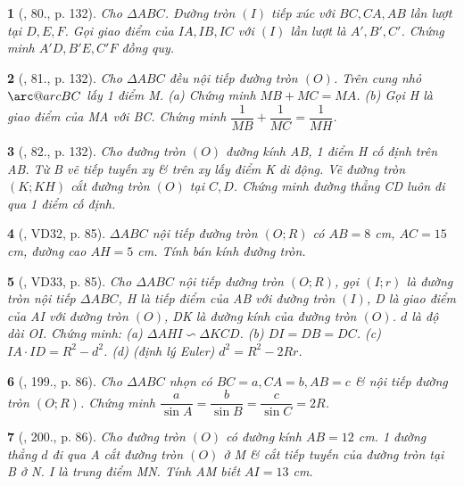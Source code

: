 \documentclass{article}
\makeatletter
\newcommand{\arc@char}{{\usefont{U}{tipa}{m}{n}\symbol{62}}}%
\newcommand{\arc}[1]{\mathpalette\arc@arc{#1}}
\newcommand{\arc@arc}[2]{%
	\sbox0{$\m@th#1#2$}%
	\vbox{
		\hbox{\resizebox{\wd0}{\height}{\arc@char}}
		\nointerlineskip
		\box0
	}%
}
\newtheorem{baitoan}{}
\makeatother
\begin{document}
\begin{baitoan}[\cite{Tuyen_Toan_9_old}, 80., p. 132]
	Cho $\Delta ABC$. Đường tròn $(I)$ tiếp xúc với $BC,CA,AB$ lần lượt tại $D,E,F$. Gọi giao điểm của $IA,IB,IC$ với $(I)$ lần lượt là $A',B',C'$. Chứng minh $A'D,B'E,C'F$ đồng quy.
\end{baitoan}

\begin{baitoan}[\cite{Tuyen_Toan_9_old}, 81., p. 132]
	Cho $\Delta ABC$ đều nội tiếp đường tròn $(O)$. Trên cung nhỏ $\arc{BC}$ lấy 1 điểm M. (a) Chứng minh $MB + MC = MA$. (b) Gọi H là giao điểm của MA với BC. Chứng minh $\dfrac{1}{MB} + \dfrac{1}{MC} = \dfrac{1}{MH}$.
\end{baitoan}

\begin{baitoan}[\cite{Tuyen_Toan_9_old}, 82., p. 132]
	Cho đường tròn $(O)$ đường kính AB, 1 điểm H cố định trên AB. Từ B vẽ tiếp tuyến xy \& trên xy lấy điểm K di động. Vẽ đường tròn $(K;KH)$ cắt đường tròn $(O)$ tại $C,D$. Chứng minh đường thẳng CD luôn đi qua 1 điểm cố định.
\end{baitoan}

\begin{baitoan}[\cite{Binh_Toan_9_tap_2}, VD32, p. 85]
	$\Delta ABC$ nội tiếp đường tròn $(O;R)$ có $AB = 8$ {\rm cm}, $AC = 15$ {\rm cm}, đường cao $AH = 5$ {\rm cm}. Tính bán kính đường tròn.
\end{baitoan}

\begin{baitoan}[\cite{Binh_Toan_9_tap_2}, VD33, p. 85]
	Cho $\Delta ABC$ nội tiếp đường tròn $(O;R)$, gọi $(I;r)$ là đường tròn nội tiếp $\Delta ABC$, H là tiếp điểm của AB với đường tròn $(I)$, D là giao điểm của AI với đường tròn $(O)$, DK là đường kính của đường tròn $(O)$. $d$ là độ dài OI. Chứng minh: (a) $\Delta AHI\backsim\Delta KCD$. (b) $DI = DB = DC$. (c) $IA\cdot ID = R^2 - d^2$. (d) {\rm(định lý Euler)} $d^2 = R^2 - 2Rr$.
\end{baitoan}

\begin{baitoan}[\cite{Binh_Toan_9_tap_2}, 199., p. 86]
	Cho $\Delta ABC$ nhọn có $BC = a,CA = b,AB = c$ \& nội tiếp đường tròn $(O;R)$. Chứng minh $\dfrac{a}{\sin A} = \dfrac{b}{\sin B} = \dfrac{c}{\sin C} = 2R$.
\end{baitoan}

\begin{baitoan}[\cite{Binh_Toan_9_tap_2}, 200., p. 86]
	Cho đường tròn $(O)$ có đường kính $AB = 12$ {\rm cm}. 1 đường thẳng $d$ đi qua A cắt đường tròn $(O)$ ở M \& cắt tiếp tuyến của đường tròn tại B ở N. I là trung điểm MN. Tính AM biết $AI = 13$ {\rm cm}.
\end{baitoan}
\end{document}
